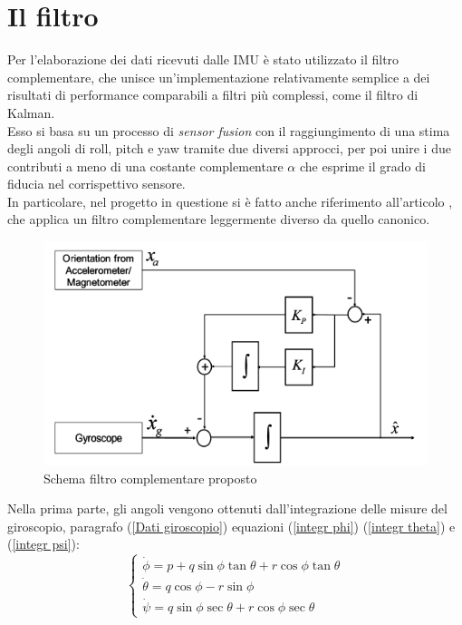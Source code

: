 \section{Il filtro}

Per l'elaborazione dei dati ricevuti dalle IMU è stato utilizzato il filtro complementare, che unisce un'implementazione relativamente semplice a dei risultati di performance comparabili a filtri più complessi, come il filtro di Kalman.\\

Esso si basa su un processo di \textit{sensor fusion} con il raggiungimento di una stima degli angoli di roll, pitch e yaw tramite due diversi approcci, per poi unire i due contributi a meno di una costante complementare $\alpha$ che esprime il grado di fiducia nel corrispettivo sensore.\\

In particolare, nel progetto in questione si è fatto anche riferimento all'articolo \cite{KOTTATH2017574}, che applica un filtro complementare leggermente diverso da quello canonico.

\begin{figure}[H]
    \includegraphics[scale=1]{immagini/filter.png}
    \centering
    \caption{Schema filtro complementare proposto}
\end{figure}

Nella prima parte, gli angoli vengono ottenuti dall'integrazione delle misure del giroscopio, paragrafo (\ref{Dati giroscopio}) equazioni (\ref{integr phi}) (\ref{integr theta}) e (\ref{integr psi}):\\

\begin{equation*}
    \begin{cases}
        \dot{\phi} = p + q \sin{\phi} \tan{\theta} + r \cos{\phi} \tan{\theta}\\
        \dot{\theta} = q \cos{\phi} - r \sin{\phi}\\
        \dot{\psi} = q \sin{\phi} \sec{\theta} + r \cos{\phi} \sec{\theta}
    \end{cases}
\end{equation*}\\

